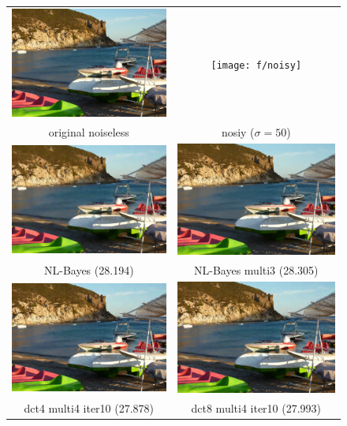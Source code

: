 \documentclass{ipol}
\begin{document}
\begin{figure}[htbp]
\begin{center}
\begin{tabular}{cc}

\includegraphics[width = .44\textwidth]{f/orig} &
\texttt{[image: f/noisy]} \\
original noiseless  & nosiy ($\sigma=50$) \\

\includegraphics[width = .44\textwidth]{f/nlb} &
\includegraphics[width = .44\textwidth]{f/nlb_multi3} \\
 NL-Bayes (28.194) &  NL-Bayes multi3 (28.305)  \\

\includegraphics[width = .44\textwidth]{f/dct4_multi4_iter10}&
\includegraphics[width = .44\textwidth]{f/dct8_multi4_iter10}\\
dct4 multi4 iter10 (27.878) &  dct8 multi4 iter10 (27.993) \\


\end{tabular}
\end{center}
\end{figure}
\end{document}
